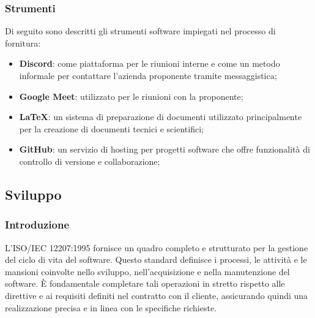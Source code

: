 \subsubsection{Strumenti}
Di seguito sono descritti gli strumenti software impiegati nel processo di fornitura:
\begin{itemize}
	\item \textbf{Discord}: come piattaforma per le riunioni interne e come un metodo informale per contattare l'azienda proponente tramite messaggistica;
	\item \textbf{Google Meet}: utilizzato per le riunioni con la proponente;
	\item \textbf{LaTeX}: un sistema di preparazione di documenti utilizzato principalmente per la creazione di documenti tecnici e scientifici;
	\item \textbf{GitHub}: un servizio di hosting per progetti software che offre funzionalità di controllo di versione e collaborazione;
\end{itemize}

\subsection{Sviluppo}
\subsubsection{Introduzione}
L'ISO/IEC 12207:1995 fornisce un quadro completo e strutturato per la gestione del ciclo di vita del software. Questo standard definisce i processi, le attività e le mansioni coinvolte nello sviluppo, nell'acquisizione e nella manutenzione del software.
È fondamentale completare tali operazioni in stretto rispetto alle direttive e ai requisiti definiti nel contratto con il cliente, assicurando quindi una realizzazione precisa e in linea con le specifiche richieste.
